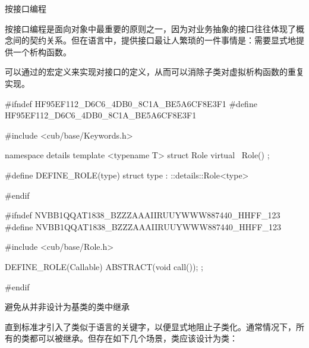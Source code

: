 \begin{content}

\begin{regulation}
按接口编程
\end{regulation}

按接口编程是面向对象中最重要的原则之一，因为对业务抽象的接口往往体现了概念间的契约关系。但在\cpp{}语言中，提供接口最让人繁琐的一件事情是：需要显式地提供一个析构函数。

可以通过的宏定义来实现对接口的定义，从而可以消除子类对虚拟析构函数的重复实现。

\begin{leftbar}
\begin{c++}[caption={\ttfamily{cub/dci/Role.h}}]
#ifndef HF95EF112_D6C6_4DB0_8C1A_BE5A6CF8E3F1
#define HF95EF112_D6C6_4DB0_8C1A_BE5A6CF8E3F1

#include <cub/base/Keywords.h>

namespace details
{
   template <typename T>
   struct Role
   {
      virtual ~Role() {}
   };
}

#define DEFINE_ROLE(type) struct type : ::details::Role<type>

#endif
\end{c++}
\end{leftbar}

\begin{leftbar}
\begin{c++}[caption={\ttfamily{cub/thread/Callable.h}}]
#ifndef NVBB1QQAT1838_BZZZAAAIIRUUYWWW887440_HHFF_123
#define NVBB1QQAT1838_BZZZAAAIIRUUYWWW887440_HHFF_123

#include <cub/base/Role.h>

DEFINE_ROLE(Callable)
{
    ABSTRACT(void call());
};

#endif
\end{c++}
\end{leftbar}

\begin{regulation}
避免从并非设计为基类的类中继承
\end{regulation}

直到\cpp{}标准才引入了类似于语言的关键字，以便显式地阻止子类化。通常情况下，所有的\cpp{}类都可以被继承。但存在如下几个场景，类应该设计为类：

\begin{enum}
\end{enum}


\end{content}
